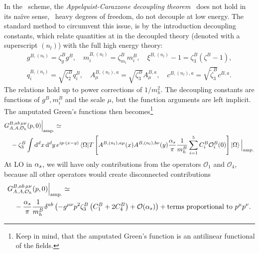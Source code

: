 In the \MS\ scheme, the \textit{Appelquist-Carazzone decoupling theorem}~\cite{Appelquist:1974tg} does not hold in its na\"ive sense, \ie\ heavy degrees of freedom, do not decouple at low energy. The standard method to circumvent this issue, is by the introduction decoupling constants, which relate quantities at in the decoupled theory (denoted with a superscript $(n_l)$) with the full high energy theory:
\begin{equation}
\begin{gathered}
g^{B, (n_l)} = \zeta_g^B g^{B}, \quad m_i^{B, (n_l)} = \zeta_{m_i}^B m_i^B, \quad \xi^{B,(n_l)} - 1 = \zeta_3^{B} (\zeta^{B} - 1), \\
q_i^{B,(n_l)} = \sqrt{\zeta_2^B} q_i^{B}, \quad A_\mu^{B,(n_l),a} = \sqrt{\zeta_3^B} A^{B, a}_\mu, \quad c^{B,(n_l),a} = \sqrt{\tilde{\zeta}_3^B} c^{B,a}.
\end{gathered}
\label{eq:4:decoupling}
\end{equation}
The relations hold up to power corrections of $1/m_h^2$. The decoupling constants are functions of $g^B, m_i^B$ and the scale $\mu$, but the function arguments are left implicit. The amputated Green's functions then becomes\footnote{Keep in mind, that the amputated Green's function is an antilinear functional of the fields.}
\begin{equation}
\begin{split}
&G_{A,A,\mathcal{O}_h}^{B,ab\, \mu\nu} (p, 0) \Big \vert_{\text{amp.}} \simeq \\
&\quad- \zeta_3^B \int \mathrm{d}^d x\, \mathrm{d}^d y\, e^{ip\cdot (x - y)} \braket{\Omega| T \left[ A^{B,(n_l),a\mu}(x) A^{B, (n_l), b \nu}(y) \frac{\alpha_s}{\pi} \frac{1}{m_h^B} \sum_{i=1}^5 C_i^B \mathcal{O}_i^B(0) \right] |\Omega} \Big \vert_{\text{amp.}} \\
\end{split}
\end{equation}
At \acs{LO} in $\alpha_s$, we will have only contributions from the operators $\mathcal{O}_1$ and $\mathcal{O}_4$, because all other operators would create disconnected contributions
\begin{equation}
\begin{split}
&G_{A,A,\mathcal{O}_h}^{B,ab\, \mu\nu} (p, 0) \Big \vert_{\text{amp.}}  \simeq \\
&\quad -\frac{\alpha_s}{\pi} \frac{1}{m_h^B}\delta^{ab} \left(-g^{\mu \nu} p^2 \zeta_3^B \left( C_1^B + 2 C_4^B \right) + \mathcal{O}\!\left(\alpha_s\right) \right) + \text{terms proportional to } p^\mu p^\nu .
\end{split}
\end{equation}
